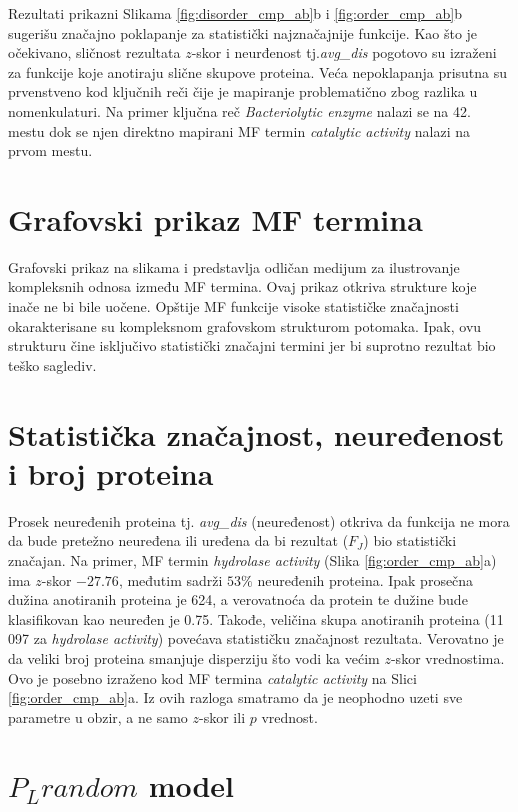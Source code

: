 Rezultati prikazni Slikama \ref{fig:disorder_cmp_ab}b i
\ref{fig:order_cmp_ab}b sugerišu značajno poklapanje za statistički
najznačajnije funkcije. Kao što je očekivano, sličnost rezultata $z$-skor i
neurđenost tj.\textit{avg\_dis} pogotovo su izraženi za funkcije koje anotiraju
slične skupove proteina. Veća nepoklapanja prisutna su prvenstveno kod ključnih
reči čije je mapiranje problematično zbog razlika u nomenkulaturi. Na primer
ključna reč \textit{Bacteriolytic enzyme} nalazi se na 42. mestu dok se njen
direktno mapirani MF termin \textit{catalytic activity} nalazi na prvom mestu.

\section{Grafovski prikaz MF termina}

Grafovski prikaz na slikama  i  predstavlja
odličan medijum za ilustrovanje kompleksnih odnosa između MF termina. Ovaj
prikaz otkriva strukture koje inače ne bi bile uočene.  Opštije MF funkcije
visoke statističke značajnosti okarakterisane su kompleksnom grafovskom
strukturom potomaka. Ipak, ovu strukturu čine isključivo statistički značajni
termini jer bi suprotno rezultat bio  teško saglediv.

\section{Statistička značajnost, neuređenost i broj proteina}

Prosek neuređenih proteina tj. \textit{avg\_dis} (neuređenost) otkriva da
funkcija ne mora da bude pretežno neuređena ili uređena da bi rezultat ($F_J$)
bio statistički značajan.  Na primer, MF termin \textit{hydrolase activity}
(Slika \ref{fig:order_cmp_ab}a) ima $z$-skor $-27.76$, međutim sadrži $53\%$
neuređenih proteina. Ipak prosečna dužina anotiranih proteina je 624, a
verovatnoća da protein te dužine bude klasifikovan kao neuređen je 0.75.
Takođe, veličina skupa anotiranih proteina (11 097 za \textit{hydrolase
activity}) povećava statističku značajnost rezultata. Verovatno je da veliki
broj proteina smanjuje disperziju što vodi ka većim $z$-skor vrednostima.  Ovo
je posebno izraženo kod MF termina \textit{catalytic activity} na Slici
\ref{fig:order_cmp_ab}a.  Iz ovih razloga smatramo da je neophodno uzeti sve
parametre u obzir, a ne samo $z$-skor ili $p$ vrednost.

\section{$P_Lrandom$ model}

